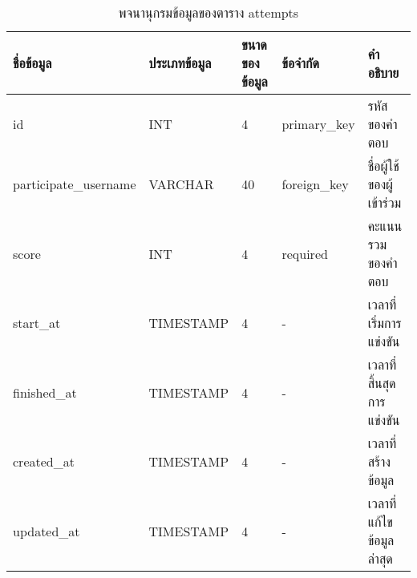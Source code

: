 \begin{table}[H]
    \caption{พจนานุกรมข้อมูลของตาราง attempts}
    \label{tab:database-attempts}
    \begin{tabularx}{\textwidth}{ | p{2.25cm} | p{2.20cm} | p{2.45cm} | p{2.05cm} | X | }
    \hline
    \textbf{ชื่อข้อมูล} & \textbf{ประเภทข้อมูล} & \textbf{ขนาดของข้อมูล} & \textbf{ข้อจำกัด} & \textbf{คำอธิบาย} \\
    \hline
    id & INT & 4 & primary\_key & รหัสของคำตอบ \\
    \hline
    participate\_username & VARCHAR & 40 & foreign\_key & ชื่อผู้ใช้ของผู้เข้าร่วม \\
    \hline
    score & INT & 4 & required & คะแนนรวมของคำตอบ \\
    \hline
    start\_at & TIMESTAMP & 4 & - & เวลาที่เริ่มการแข่งขัน \\
    \hline
    finished\_at & TIMESTAMP & 4 & - & เวลาที่สิ้นสุดการแข่งขัน \\
    \hline
    created\_at & TIMESTAMP & 4 & - & เวลาที่สร้างข้อมูล \\
    \hline
    updated\_at & TIMESTAMP & 4 & - & เวลาที่แก้ไขข้อมูลล่าสุด \\
    \hline
    \end{tabularx}
\end{table}
